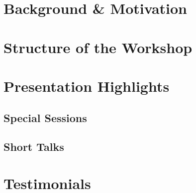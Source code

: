 \tableofcontents

\section{Background \& Motivation}



\section{Structure of the Workshop}



\section{Presentation Highlights}

\subsection{Special Sessions}





\subsection{Short Talks}
\label{sec:short-talks}















\section{Testimonials}






